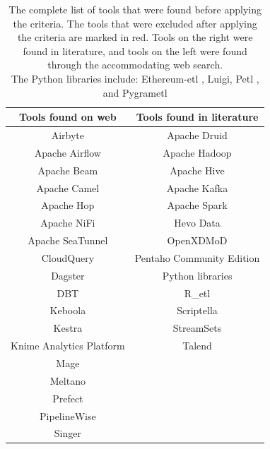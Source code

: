\documentclass[11pt]{article}
\begin{document}
\begin{table}
\centering
    \begin{tabular}{|c|c|}
        \hline
        \textbf{Tools found on web} & \textbf{Tools found in literature} \\ \hline
        Airbyte & Apache Druid \cite{Dymora202363} \\ \hline 
        Apache Airflow & Apache Hadoop \cite{Song2018233, Yoo2019476, Dymora202363} \\ \hline  
        Apache Beam & Apache Hive \cite{Yoo2019476, HouSu20221581, Dymora202363, Camacho-Rodríguez20191773} \\ \hline  
        Apache Camel & Apache Kafka \cite{Dymora202363} \\ \hline
        Apache Hop & Apache Spark \cite{Song2018233} \\ \hline  
        Apache NiFi & {\color[HTML]{FE0000} Hevo Data \cite{Sreemathy20211650}} \\ \hline  
        Apache SeaTunnel & {\color[HTML]{FE0000} OpenXDMoD \cite{Dean2022}}  \\ \hline  
        CloudQuery & Pentaho Community Edition \cite{Sreemathy20211650, Fang2022, Zheng2023} \\ \hline  
        Dagster & Python libraries\text{*} \cite{Fissore2018267} \\ \hline  
        DBT & R\_etl \cite{Biswas_programming2019267, Biswas_realtime202053} \\ \hline  
        {\color[HTML]{FE0000} Keboola} & {\color[HTML]{FE0000} Scriptella \cite{Biswas_programming2019267, Biswas_realtime202053}}\\ \hline
        Kestra & {\color[HTML]{FE0000} StreamSets \cite{Sreemathy20211650}} \\ \hline
        Knime Analytics Platform & {\color[HTML]{FE0000} Talend \cite{Espinoza2023, Sreemathy20211650}} \\ \hline
        Mage & \\ \hline
        Meltano & \\ \hline
        Prefect & \\ \hline
        PipelineWise & \\ \hline
        Singer & \\ \hline
    \end{tabular}
    \caption{The complete list of tools that were found before applying the criteria. The tools that were excluded after applying the criteria are marked in red. Tools on the right were found in literature, and tools on the left were found through the accommodating web search. \\
    \text{*}The Python libraries include: Ethereum-etl \cite{Camozzi2022},  Luigi, Petl \cite{Biswas_programming2019267, Biswas_realtime202053}, and Pygrametl\cite{Thomsen201821, Jensen202145, Biswas_programming2019267, Biswas_realtime202053}}
\label{table:tools}
\end{table}
\end{document}
